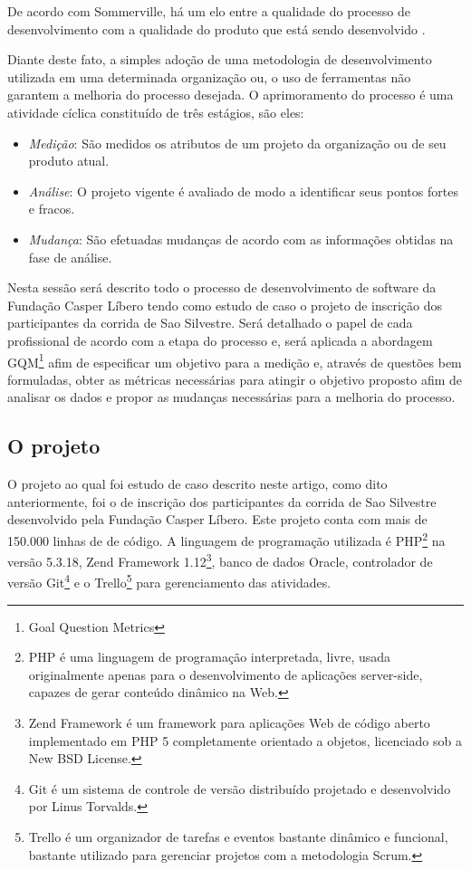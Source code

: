 \documentclass[11pt, a4paper]{article}
\begin{document}
De acordo com Sommerville, há um elo entre a qualidade do processo de desenvolvimento com a qualidade do produto que está sendo desenvolvido \cite[p.440]{sommerville}. 

Diante deste fato, a simples adoção de uma metodologia de desenvolvimento utilizada em uma determinada organização ou, o uso de ferramentas não garantem a melhoria do processo desejada. O aprimoramento do processo é uma atividade cíclica constituído de três estágios, são eles:

\begin{itemize}
	\item \textit{Medição}: São medidos os atributos de um projeto da organização ou de seu produto atual.
	\item \textit{Análise}: O projeto vigente é avaliado de modo a identificar seus pontos fortes e fracos.
	\item \textit{Mudança}: São efetuadas mudanças de acordo com as informações obtidas na fase de análise.
\end{itemize}
\cite[p.441]{sommerville}

Nesta sessão será descrito todo o processo de desenvolvimento de software da Fundação Casper Líbero tendo como estudo de caso o projeto de inscrição dos participantes da corrida de Sao Silvestre. Será detalhado o papel de cada profissional de acordo com a etapa do processo e, será aplicada a abordagem GQM\footnote{Goal Question Metrics} afim de especificar um objetivo para a medição e, através de questões bem formuladas, obter as métricas necessárias para atingir o objetivo proposto afim de analisar os dados e propor as mudanças necessárias para a melhoria do processo.

\subsection{O projeto}
O projeto ao qual foi estudo de caso descrito neste artigo, como dito anteriormente, foi o de inscrição dos participantes da corrida de Sao Silvestre desenvolvido pela Fundação Casper Líbero. Este projeto conta com mais de 150.000 linhas de de código. A linguagem de programação utilizada é PHP\footnote{PHP é uma linguagem de programação interpretada, livre, usada originalmente apenas para o desenvolvimento de aplicações server-side, capazes de gerar conteúdo dinâmico na Web.} na versão 5.3.18, Zend Framework 1.12\footnote{Zend Framework é um framework para aplicações Web de código aberto implementado em PHP 5 completamente orientado a objetos,  licenciado sob a New BSD License.}, banco de dados Oracle, controlador de versão Git\footnote{Git é um sistema de controle de versão distribuído projetado e desenvolvido por Linus Torvalds.} e o Trello\footnote{Trello é um organizador de tarefas e eventos bastante dinâmico e funcional, bastante utilizado para gerenciar projetos com a metodologia Scrum.} para gerenciamento das atividades.
\end{document}
